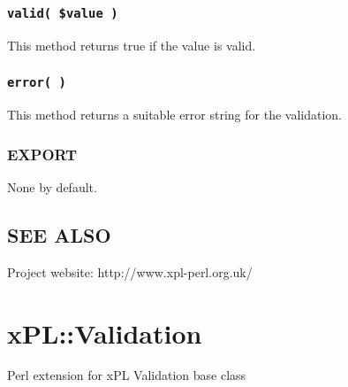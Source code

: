 \subsubsection*{\texttt{valid( \$value )}\label{xPL::Validation::Pattern_valid_value_}}


This method returns true if the value is valid.

\subsubsection*{\texttt{error( )}\label{xPL::Validation::Pattern_error_}}


This method returns a suitable error string for the validation.

\subsubsection*{EXPORT\label{xPL::Validation::Pattern_EXPORT}}


None by default.

\subsection*{SEE ALSO\label{xPL::Validation::Pattern_SEE_ALSO}}


Project website: http://www.xpl-perl.org.uk/

\section{xPL::Validation\label{xPL::Validation}}


Perl extension for xPL Validation base class

